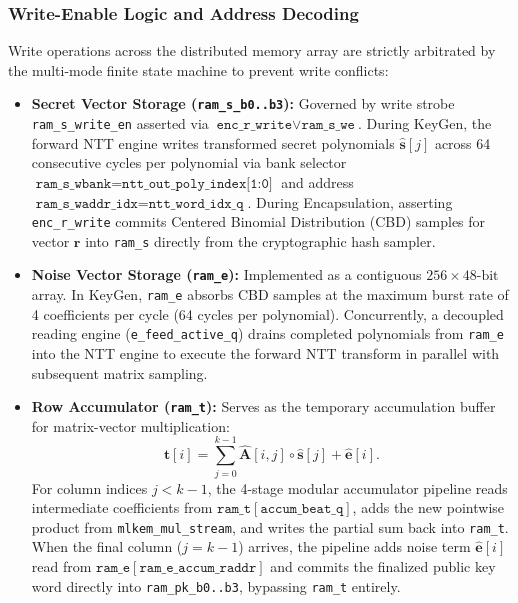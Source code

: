 \subsubsection{Write-Enable Logic and Address Decoding}
Write operations across the distributed memory array are strictly arbitrated by the multi-mode finite state machine to prevent write conflicts:
\begin{itemize}
    \item \textbf{Secret Vector Storage (\texttt{ram\_s\_b0..b3}):} Governed by write strobe \texttt{ram\_s\_write\_en} asserted via $\texttt{enc\_r\_write} \lor \texttt{ram\_s\_we}$. During KeyGen, the forward NTT engine writes transformed secret polynomials $\hat{\mathbf{s}}[j]$ across 64 consecutive cycles per polynomial via bank selector $\texttt{ram\_s\_wbank} = \texttt{ntt\_out\_poly\_index[1:0]}$ and address $\texttt{ram\_s\_waddr\_idx} = \texttt{ntt\_word\_idx\_q}$. During Encapsulation, asserting \texttt{enc\_r\_write} commits Centered Binomial Distribution (CBD) samples for vector $\mathbf{r}$ into \texttt{ram\_s} directly from the cryptographic hash sampler.
    
    \item \textbf{Noise Vector Storage (\texttt{ram\_e}):} Implemented as a contiguous $256 \times 48\text{-bit}$ array. In KeyGen, \texttt{ram\_e} absorbs CBD samples at the maximum burst rate of 4 coefficients per cycle (64 cycles per polynomial). Concurrently, a decoupled reading engine (\texttt{e\_feed\_active\_q}) drains completed polynomials from \texttt{ram\_e} into the NTT engine to execute the forward NTT transform in parallel with subsequent matrix sampling.
    
    \item \textbf{Row Accumulator (\texttt{ram\_t}):} Serves as the temporary accumulation buffer for matrix-vector multiplication:
    \begin{equation}
    \label{eq:matrix_accum}
    \hat{\mathbf{t}}[i] = \sum_{j=0}^{k-1} \hat{\mathbf{A}}[i, j] \circ \hat{\mathbf{s}}[j] + \hat{\mathbf{e}}[i].
    \end{equation}
    For column indices $j < k-1$, the 4-stage modular accumulator pipeline reads intermediate coefficients from $\texttt{ram\_t}[\texttt{accum\_beat\_q}]$, adds the new pointwise product from \texttt{mlkem\_mul\_stream}, and writes the partial sum back into \texttt{ram\_t}. When the final column ($j = k-1$) arrives, the pipeline adds noise term $\hat{\mathbf{e}}[i]$ read from $\texttt{ram\_e}[\texttt{ram\_e\_accum\_raddr}]$ and commits the finalized public key word directly into \texttt{ram\_pk\_b0..b3}, bypassing \texttt{ram\_t} entirely.
    

\end{itemize}
